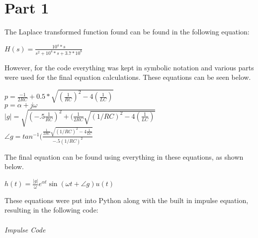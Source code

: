 \documentclass[12pt,a4paper]{article}
\begin{document}
\section{Part 1}
The Laplace transformed function found can be found in the following equation:\\
\begin{center}
       $H(s)=\frac{10^4*s}{s^2+10^4*s+3.7*10^8}$\\
\end{center}
However, for the code everything was kept in symbolic notation and various parts were used for the final equation calculations. These equations can be seen below.\\
\begin{center}
       $p=\frac{-1}{2RC} + 0.5 * \sqrt{(\frac{1}{RC})^2 -4(\frac{1}{LC})}$\\
       $p=\alpha + j\omega$\\
       $\vert g \vert=\sqrt{(-.5\frac{1}{RC})^2+(\frac{1}{2RC}\sqrt{(1/RC)^2-4(\frac{1}{LC})}}$\\
       $\angle g = tan^{-1}(\frac{\frac{1}{2RC}\sqrt{(1/RC)^2-4\frac{1}{LC}}}{-.5(1/RC)^2}$
\end{center}
The final equation can be found using everything in these equations, as shown below.
\begin{center}
    $h(t)=\frac{\vert g \vert}{\omega}e^{\alpha t} \sin{(\omega t + \angle g)}u(t)$
\end{center}
These equations were put into Python along with the built in impulse equation, resulting in the following code:\\
\\
\textit{Impulse Code}
\end{document}
